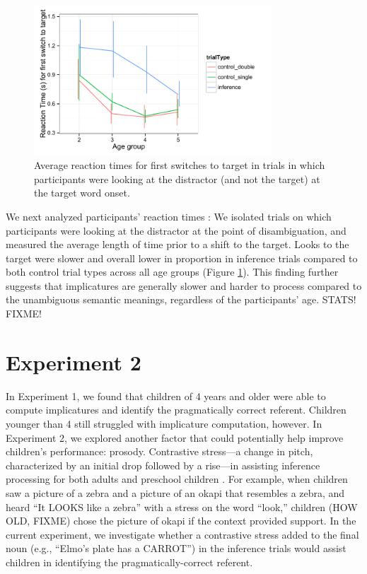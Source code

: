 \documentclass[10pt,letterpaper]{article}
\begin{document}
\begin{figure}
\begin{centering} 
\includegraphics[width=3.5in]{figures/150116-0-rt_age.pdf}
\caption{\label{fig:rt} Average reaction times for first switches to target in trials in which participants were looking at the distractor (and not the target) at the target word onset.}
\end{centering} 

\end{figure}

We next analyzed participants' reaction times \cite{fernald2008looking}: We isolated trials on which participants were looking at the distractor at the point of disambiguation, and measured the average length of time prior to a shift to the target. Looks to the target were slower and overall lower in proportion in inference trials compared to both control trial types across all age groups (Figure \ref{fig:rt}). This finding further suggests that implicatures are generally slower and harder to process compared to the unambiguous semantic meanings, regardless of the participants' age. STATS! FIXME!

\section{Experiment 2}

In Experiment 1, we found that children of 4 years and older were able to compute implicatures and identify the pragmatically correct referent. Children younger than 4 still struggled with implicature computation, however. In Experiment 2, we explored another factor that could potentially help improve children's performance: prosody. Contrastive stress---a change in pitch, characterized by an initial drop followed by a rise---in assisting inference processing for both adults \cite{ito2008anticipatory} and preschool children \cite{kurumada1contextual}. For example, when children saw a picture of a zebra and a picture of an okapi that resembles a zebra, and heard ``It LOOKS like a zebra'' with a stress on the word ``look,'' children (HOW OLD, FIXME) chose the picture of okapi if the context provided support. In the current experiment, we investigate whether a contrastive stress added to the final noun (e.g., ``Elmo's plate has a CARROT'') in the inference trials would assist children in identifying the pragmatically-correct referent.
\end{document}
